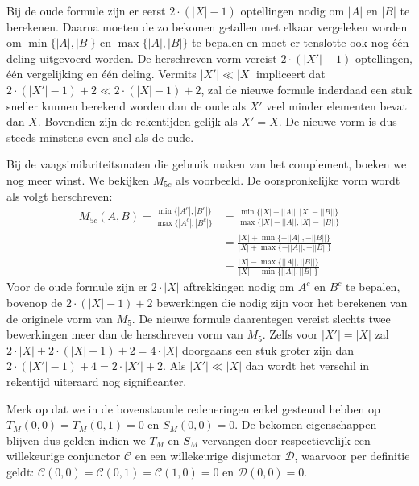 Bij de oude formule zijn er eerst $2 \cdot (|X|-1)$ optellingen nodig
om $|A|$ en $|B|$ te berekenen. Daarna moeten de zo bekomen getallen met elkaar vergeleken worden
om $\min\{|A|,|B|\}$ en $\max\{|A|,|B|\}$ te bepalen en moet er tenslotte ook nog \'e\'en deling
uitgevoerd worden. De herschreven vorm vereist $ 2 \cdot (|X'|-1)$ optellingen, \'e\'en vergelijking
en \'e\'en deling. Vermits $|X'| \ll |X|$ impliceert 
dat $2 \cdot (|X'|-1) + 2 \ll 2 \cdot (|X|-1) + 2$, zal de nieuwe formule inderdaad een stuk sneller kunnen 
berekend worden dan de oude als $X'$ veel minder elementen bevat dan $X$. Bovendien zijn de rekentijden
gelijk als $X'=X$. De nieuwe vorm is dus steeds minstens even snel als de oude.

Bij de vaagsimilariteitsmaten die gebruik maken van het complement, boeken we nog meer winst.
We bekijken $M_{5c}$ als voorbeeld. De oorspronkelijke vorm wordt als volgt herschreven:
\begin{align*}
\displaystyle M_{5c}(A,B) = \displaystyle \frac{\min \{|A^c|,|B^c|\}}{\max \{|A^c|,|B^c|\}} 
& = \displaystyle \frac{\min \{|X|-||A||,|X|-||B||\}}{\max \{|X|-||A||,|X|-||B||\}} \\
& = \displaystyle \frac{|X| + \min \{-||A||,-||B||\}}{|X| + \max \{-||A||,-||B||\}} \\
& = \displaystyle \frac{|X| - \max \{||A||,||B||\}}{|X| - \min \{||A||,||B||\}}
\end{align*}
Voor de oude formule zijn er $2\cdot |X|$ aftrekkingen nodig om $A^c$ en $B^c$ te bepalen,
bovenop de $2 \cdot (|X|-1) + 2$ bewerkingen die nodig zijn voor het berekenen van 
de originele vorm van $M_5$. De nieuwe formule daarentegen vereist slechts twee bewerkingen
meer dan de herschreven vorm van $M_5$. Zelfs voor $|X'| = |X|$ zal 
$2 \cdot |X| + 2 \cdot (|X|-1) + 2 = 4 \cdot |X|$ doorgaans een stuk groter zijn dan
$2 \cdot (|X'|-1) + 4 = 2 \cdot |X'| + 2$. Als $|X'| \ll |X|$ dan wordt het verschil in rekentijd
uiteraard nog significanter.

Merk op dat we in de bovenstaande redeneringen enkel gesteund hebben op $T_M(0,0)=T_M(0,1)=0$ en 
$S_M(0,0)=0$. 
De bekomen eigenschappen blijven dus gelden indien we $T_M$ en $S_M$ vervangen door respectievelijk 
een willekeurige conjunctor $\mathcal{C}$ en een willekeurige disjunctor $\mathcal{D}$, waarvoor per 
definitie geldt: $\mathcal{C}(0,0)=\mathcal{C}(0,1)=\mathcal{C}(1,0)=0$ en $\mathcal{D}(0,0)=0$. 